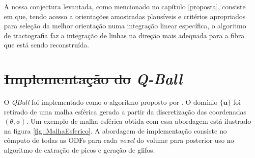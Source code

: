 \documentclass[
    12pt,                %
    oneside,            %
    a4paper,            %
    english,            %
    french,                %
    spanish,            %
    brazil                %
    ]{abntex2}
\begin{document}
A nossa conjectura levantada, como mencionado no capítulo \ref{proposta}, consiste em que, tendo acesso a orientações amostradas plausíveis e critérios apropriados para seleção da melhor orientação numa integração linear específica, o algoritmo de tractografia faz a integração de linhas na direção mais adequada para a fibra que está sendo reconstruída.


%


\section{\sout{Implementação do }\textit{Q-Ball}}

O \textit{QBall} foi implementado como o algoritmo proposto por . O domínio $\{\textbf{u}\}$ foi retirado de uma malha esférica gerada a partir da discretização das coordenadas $(\theta, \phi)$. Um exemplo de malha esférica obtida com essa abordagem está ilustrado na figura \ref{fig::MalhaEsferico}.
A abordagem de implementação consiste no cômputo de todas as ODFs para cada \textit{voxel} do volume para posterior uso no algoritmo de extração de picos e geração de glifos.


\end{document}
